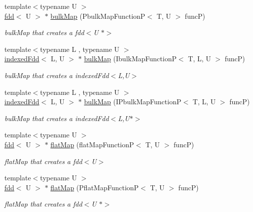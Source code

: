 \begin{DoxyCompactItemize}
{\footnotesize template$<$typename U $>$ }\\\hyperlink{classfaster_1_1fdd}{fdd}$<$ U $>$ $\ast$ \hyperlink{group__bulk_ga72e07b032ee97aeed0261a20769720a7}{bulk\+Map} (Pbulk\+Map\+FunctionP$<$ T, U $>$ funcP)
\begin{DoxyCompactList}\small\item\em bulk\+Map that creates a fdd$<$\+U $\ast$$>$ \end{DoxyCompactList}\item 
{\footnotesize template$<$typename L , typename U $>$ }\\\hyperlink{classfaster_1_1indexedFdd}{indexed\+Fdd}$<$ L, U $>$ $\ast$ \hyperlink{group__bulk_ga97ad1e63823abe30de230da1456481d4}{bulk\+Map} (Ibulk\+Map\+FunctionP$<$ T, L, U $>$ funcP)
\begin{DoxyCompactList}\small\item\em bulk\+Map that creates a indexed\+Fdd$<$\+L,\+U$>$ \end{DoxyCompactList}\item 
{\footnotesize template$<$typename L , typename U $>$ }\\\hyperlink{classfaster_1_1indexedFdd}{indexed\+Fdd}$<$ L, U $>$ $\ast$ \hyperlink{group__bulk_gabfd585e52364a7be20125aa25c0ab141}{bulk\+Map} (I\+Pbulk\+Map\+FunctionP$<$ T, L, U $>$ funcP)
\begin{DoxyCompactList}\small\item\em bulk\+Map that creates a indexed\+Fdd$<$\+L,\+U$\ast$$>$ \end{DoxyCompactList}\item 
{\footnotesize template$<$typename U $>$ }\\\hyperlink{classfaster_1_1fdd}{fdd}$<$ U $>$ $\ast$ \hyperlink{group__flatmap_ga7efd43be1d3005d654c4656d521faf30}{flat\+Map} (flat\+Map\+FunctionP$<$ T, U $>$ funcP)
\begin{DoxyCompactList}\small\item\em flat\+Map that creates a fdd$<$\+U$>$ \end{DoxyCompactList}\item 
{\footnotesize template$<$typename U $>$ }\\\hyperlink{classfaster_1_1fdd}{fdd}$<$ U $>$ $\ast$ \hyperlink{group__flatmap_ga3f353414307512c23d88fc3e8b2e8221}{flat\+Map} (Pflat\+Map\+FunctionP$<$ T, U $>$ funcP)
\begin{DoxyCompactList}\small\item\em flat\+Map that creates a fdd$<$\+U $\ast$$>$ \end{DoxyCompactList}\item 

\end{DoxyCompactItemize}
